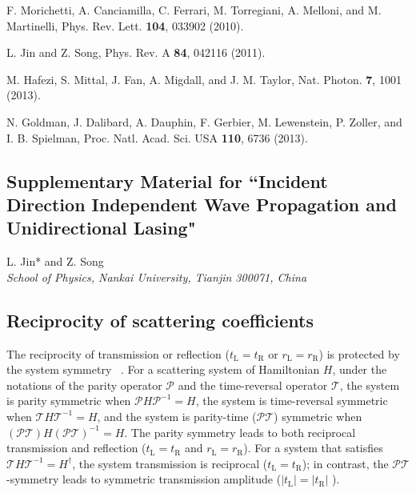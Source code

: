 \documentclass[prl,showpacs,superscriptaddress,twocolumn]{revtex4-1}
\begin{document}
\begin{thebibliography}{999}
 F. Morichetti, A. Canciamilla, C. Ferrari, M.
Torregiani, A. Melloni, and M. Martinelli, Phys. Rev. Lett. \textbf{104},
033902 (2010).

 L. Jin and Z. Song, Phys. Rev. A \textbf{84}, 042116
(2011).

 M. Hafezi, S. Mittal, J. Fan, A. Migdall, and J.
M. Taylor, Nat. Photon. \textbf{7}, 1001 (2013).

 N. Goldman, J. Dalibard, A. Dauphin, F. Gerbier, M.
Lewenstein, P. Zoller, and I. B. Spielman, Proc. Natl. Acad. Sci. USA
\textbf{110}, 6736 (2013).
\end{thebibliography}
\clearpage
\begin{widetext}
\section*{Supplementary Material for ``Incident Direction Independent Wave
Propagation and Unidirectional Lasing"}

\begin{center}
L. Jin* and Z. Song\\[2pt]
\textit{School of Physics, Nankai University, Tianjin 300071, China}
\end{center}

\subsection{Reciprocity of scattering coefficients}

The reciprocity of transmission or reflection ($t_{\mathrm{L}}=t_{\mathrm{R}%
} $ or $r_{\mathrm{L}}=r_{\mathrm{R}}$) is protected by the system symmetry~%
\cite{MugaPR,PTScattAnnPhys}. For a scattering system of Hamiltonian $H$,
under the notations of the parity operator $\mathcal{P}$ and the
time-reversal operator $\mathcal{T}$, the system is parity symmetric when $%
\mathcal{P}H\mathcal{P}^{-1}=H$, the system is time-reversal symmetric when $%
\mathcal{T}H\mathcal{T}^{-1}=H$, and the system is parity-time ($\mathcal{PT}
$) symmetric when $\mathcal{(PT)}H(\mathcal{PT})^{-1}=H$. The parity
symmetry leads to both reciprocal transmission and reflection ($t_{\mathrm{L}%
}=t_{\mathrm{R}}$ and $r_{\mathrm{L}}=r_{\mathrm{R}}$). For a system that
satisfies $\mathcal{T}H\mathcal{T}^{-1}=H^{\dagger }$, the system
transmission is reciprocal ($t_{\mathrm{L}}=t_{\mathrm{R}}$); in contrast,
the $\mathcal{PT}$-symmetry leads to symmetric transmission amplitude ($%
\left\vert t_{\mathrm{L}}\right\vert =\left\vert t_{\mathrm{R}}\right\vert $%
).


\end{widetext}
\end{document}
